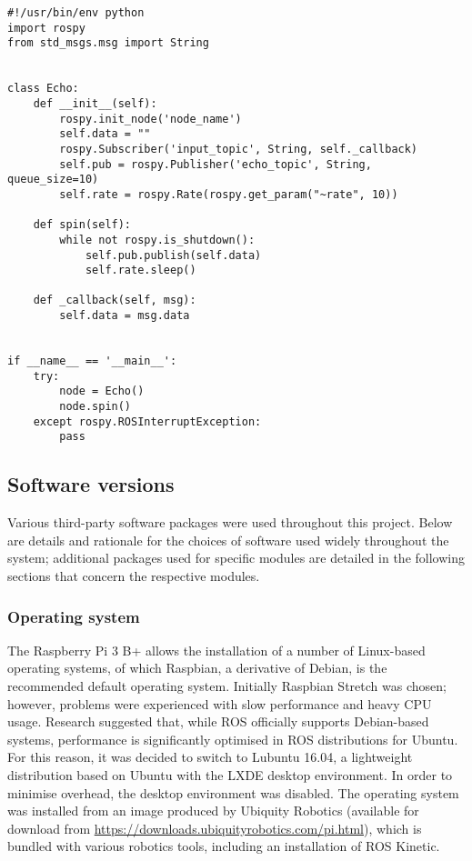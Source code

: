 \begin{lstlisting}[caption={Example ROS node}, label={lst:ros_node}]
#!/usr/bin/env python
import rospy
from std_msgs.msg import String


class Echo:
    def __init__(self):
        rospy.init_node('node_name')
        self.data = ""
        rospy.Subscriber('input_topic', String, self._callback)
        self.pub = rospy.Publisher('echo_topic', String, queue_size=10)
        self.rate = rospy.Rate(rospy.get_param("~rate", 10))

    def spin(self):
        while not rospy.is_shutdown():
            self.pub.publish(self.data)
            self.rate.sleep()

    def _callback(self, msg):
        self.data = msg.data


if __name__ == '__main__':
    try:
        node = Echo()
        node.spin()
    except rospy.ROSInterruptException:
        pass
\end{lstlisting}

\subsection{Software versions}
Various third-party software packages were used throughout this project.
Below are details and rationale for the choices of software used
widely throughout the system; additional packages used for specific modules
are detailed in the following sections that concern the respective modules.

\subsubsection{Operating system}
The Raspberry Pi 3 B+ allows the installation of a number of Linux-based
operating systems, of which Raspbian, a derivative of Debian, is the
recommended default operating system. Initially Raspbian Stretch was chosen;
however, problems were experienced with slow performance and heavy CPU usage.
Research suggested that, while ROS officially supports Debian-based
systems, performance is significantly optimised in ROS distributions for
Ubuntu. For this reason, it was decided to switch to Lubuntu 16.04, a lightweight
distribution based on Ubuntu with the LXDE desktop environment.
In order to minimise overhead, the desktop environment was disabled. The
operating system was installed from an image produced by Ubiquity
Robotics (available for download from
\url{https://downloads.ubiquityrobotics.com/pi.html}), which is
bundled with various robotics tools, including an installation of ROS
Kinetic.

